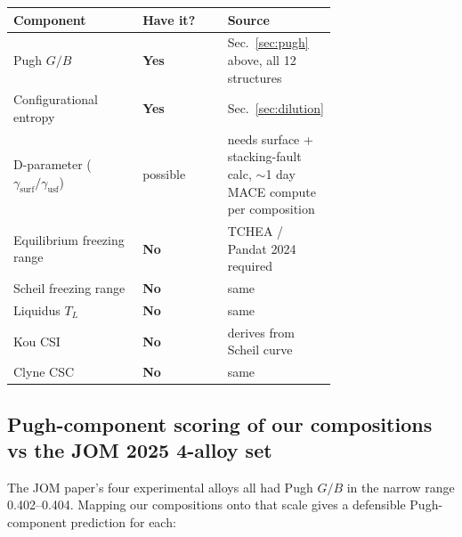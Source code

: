 \documentclass[11pt,a4paper]{article}
\begin{document}
\begin{center}
\begin{tabular}{p{0.40\linewidth}lp{0.32\linewidth}}
\toprule
\textbf{Component} & \textbf{Have it?} & \textbf{Source}\\
\midrule
Pugh $G/B$ & \cellcolor{accent!15}\textbf{Yes} & Sec.~\ref{sec:pugh} above, all 12 structures\\
Configurational entropy & \cellcolor{accent!15}\textbf{Yes} & Sec.~\ref{sec:dilution}\\
D-parameter ($\gamma_{\text{surf}}/\gamma_{\text{usf}}$) & possible & needs surface + stacking-fault calc, $\sim$1 day MACE compute per composition\\
Equilibrium freezing range & \cellcolor{warn!15}\textbf{No} & TCHEA / Pandat 2024 required\\
Scheil freezing range & \cellcolor{warn!15}\textbf{No} & same\\
Liquidus $T_L$ & \cellcolor{warn!15}\textbf{No} & same\\
Kou CSI & \cellcolor{warn!15}\textbf{No} & derives from Scheil curve\\
Clyne CSC & \cellcolor{warn!15}\textbf{No} & same\\
\bottomrule
\end{tabular}
\end{center}

\subsection{Pugh-component scoring of our compositions vs the JOM 2025 4-alloy set}

The JOM paper's four experimental alloys all had Pugh $G/B$ in the narrow
range 0.402--0.404. Mapping our compositions onto that scale gives a defensible
Pugh-component prediction for each:
\end{document}
